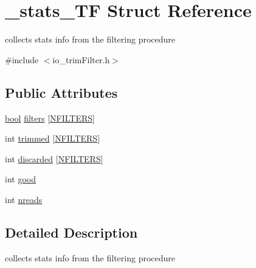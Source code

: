 \hypertarget{struct__stats__TF}{\section{\+\_\+stats\+\_\+\+T\+F Struct Reference}
\label{struct__stats__TF}
}


collects stats info from the filtering procedure  




{\ttfamily \#include $<$io\+\_\+trim\+Filter.\+h$>$}

\subsection*{Public Attributes}
\begin{DoxyCompactItemize}
\item 
\hyperlink{defines_8h_abb452686968e48b67397da5f97445f5b}{bool} \hyperlink{struct__stats__TF_a5f5b0402d226910a834373a684eb6f07}{filters} \mbox{[}\hyperlink{defines_8h_a23f1103d8247781ab0be4b0fba2f085f}{N\+F\+I\+L\+T\+E\+R\+S}\mbox{]}
\item 
int \hyperlink{struct__stats__TF_a399de2eb5fd452f019d5c8d23bae0651}{trimmed} \mbox{[}\hyperlink{defines_8h_a23f1103d8247781ab0be4b0fba2f085f}{N\+F\+I\+L\+T\+E\+R\+S}\mbox{]}
\item 
int \hyperlink{struct__stats__TF_a876a430dbbb78e3b03f9e7088da26618}{discarded} \mbox{[}\hyperlink{defines_8h_a23f1103d8247781ab0be4b0fba2f085f}{N\+F\+I\+L\+T\+E\+R\+S}\mbox{]}
\item 
int \hyperlink{struct__stats__TF_a4d36ddc878d561051a0f9464df2e0911}{good}
\item 
int \hyperlink{struct__stats__TF_a2a3993588191eb9f03416cce4fb1862f}{nreads}
\end{DoxyCompactItemize}


\subsection{Detailed Description}
collects stats info from the filtering procedure 

